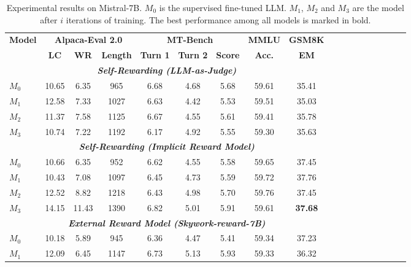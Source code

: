 
\begin{table*}[t!]
\centering
\small
\caption{Experimental results on Mistral-7B.  $M_0$ is the supervised fine-tuned LLM. $M_1$, $M_2$ and $M_3$ are the model after $i$ iterations of training. The best performance among all models is marked in bold.}
\label{tab:main_results}
\vskip 0.15in
    \begin{tabular}{lccccccccccccccccc}
    \toprule 
    \multirow{2}{*}{\textbf{Model}}  &  \multicolumn{3}{c}{\textbf{Alpaca-Eval 2.0}} & \multicolumn{3}{c}{\textbf{MT-Bench}} & \textbf{MMLU} & \textbf{GSM8K} \\
    & \textbf{LC} & \textbf{WR} & \textbf{Length} & \textbf{Turn 1} & \textbf{Turn 2} & \textbf{Score} & \textbf{Acc.} & \textbf{EM} \\
    \midrule
    \multicolumn{9}{c}{\textbf{\textit{Self-Rewarding (LLM-as-Judge)}}} \\
    $M_0$ & 10.65 & 6.35 & 965 & 6.68 & 4.68 & 5.68 & 59.61 & 35.41 \\
    $M_1$ & 12.58 & 7.33 & 1027 & 6.63 & 4.42 & 5.53  & 59.51 & 35.03\\
    $M_2$ & 11.37 & 7.58 & 1125 & 6.67 & 4.55 & 5.61 & 59.41 & 35.78 \\
    $M_3$ & 10.74 & 7.22 & 1192 & 6.17 & 4.92 & 5.55 & 59.30 & 35.63 \\
    \midrule
    \multicolumn{9}{c}{\textbf{\textit{Self-Rewarding (Implicit Reward Model)}}} \\
    $M_0$ & 10.66 & 6.35 & 952  & 6.62 & 4.55 & 5.58 & 59.65 & 37.45 \\
    $M_1$ & 10.43 & 7.08 & 1097  & 6.45 & 4.73 & 5.59 & 59.72 & 37.76 \\
    $M_2$ & 12.52 & 8.82 & 1218  &  6.43 & 4.98 & 5.70 & 59.76 & 37.45 \\
    $M_3$ & 14.15 & 11.43 & 1390  & 6.82 & 5.01 & 5.91 & 59.61 & \textbf{37.68}\\
    \midrule
    \multicolumn{9}{c}{\textbf{\textit{External Reward Model (Skywork-reward-7B)}}} \\
    $M_0$ & 10.18 & 5.89 & 945 &  6.36 & 4.47 & 5.41 & 59.34 & 37.23 \\
    $M_1$ & 12.09 & 6.45 & 1147 & 6.73 & 5.13 & 5.93 & 59.33 & 36.32\\

\end{tabular}
\end{table*}
